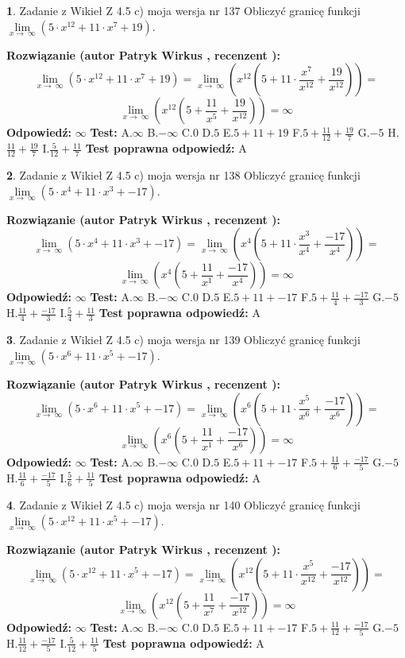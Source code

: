 \documentclass[12pt, a4paper]{article}
\theoremstyle{definition} %
\newtheorem{zad}{}
\newcommand{\zadStart}[1]{\begin{zad}#1\newline}
\newcommand{\zadStop}{\end{zad}}
\newcommand{\rozwStart}[2]{\noindent \textbf{Rozwiązanie (autor #1 , recenzent #2): }\newline}
\newcommand{\rozwStop}{\newline}
\newcommand{\odpStart}{\noindent \textbf{Odpowiedź:}\newline}
\newcommand{\odpStop}{\newline}
\newcommand{\testStart}{\noindent \textbf{Test:}\newline}
\newcommand{\testStop}{\newline}
\newcommand{\kluczStart}{\noindent \textbf{Test poprawna odpowiedź:}\newline}
\newcommand{\kluczStop}{\newline}
\begin{document}
\zadStart{Zadanie z Wikieł Z 4.5 c) moja wersja nr 137}
Obliczyć granicę funkcji  $\lim\limits_{x\to\ \infty}(5 \cdot x^{12}+11 \cdot x^{7}+19)$.
\zadStop
\rozwStart{Patryk Wirkus}{}
$$\lim\limits_{x\to\ \infty}(5 \cdot x^{12}+11 \cdot x^{7}+19) = \lim\limits_{x\to\ \infty}(x^{12}(5 +11 \cdot \frac{x^{7}}{x^{12}}+\frac{19}{x^{12}})) =$$ $$\lim\limits_{x\to\ \infty}(x^{12}(5 +\frac{11}{x^{5}}+\frac{19}{x^{12}})) =\infty$$
\rozwStop
\odpStart
$\infty$
\odpStop
\testStart
A.$\infty$ B.$-\infty$ C.$0$ D.$5$ E.$5 + 11 + 19$
F.$5+\frac{11}{12}+\frac{19}{7}$ G.$-5$
H.$\frac{11}{12}+\frac{19}{7}$
I.$\frac{5}{12}+\frac{11}{7}$
\testStop
\kluczStart
A
\kluczStop



\zadStart{Zadanie z Wikieł Z 4.5 c) moja wersja nr 138}
Obliczyć granicę funkcji  $\lim\limits_{x\to\ \infty}(5 \cdot x^{4}+11 \cdot x^{3}+-17)$.
\zadStop
\rozwStart{Patryk Wirkus}{}
$$\lim\limits_{x\to\ \infty}(5 \cdot x^{4}+11 \cdot x^{3}+-17) = \lim\limits_{x\to\ \infty}(x^{4}(5 +11 \cdot \frac{x^{3}}{x^{4}}+\frac{-17}{x^{4}})) =$$ $$\lim\limits_{x\to\ \infty}(x^{4}(5 +\frac{11}{x^{1}}+\frac{-17}{x^{4}})) =\infty$$
\rozwStop
\odpStart
$\infty$
\odpStop
\testStart
A.$\infty$ B.$-\infty$ C.$0$ D.$5$ E.$5 + 11 + -17$
F.$5+\frac{11}{4}+\frac{-17}{3}$ G.$-5$
H.$\frac{11}{4}+\frac{-17}{3}$
I.$\frac{5}{4}+\frac{11}{3}$
\testStop
\kluczStart
A
\kluczStop



\zadStart{Zadanie z Wikieł Z 4.5 c) moja wersja nr 139}
Obliczyć granicę funkcji  $\lim\limits_{x\to\ \infty}(5 \cdot x^{6}+11 \cdot x^{5}+-17)$.
\zadStop
\rozwStart{Patryk Wirkus}{}
$$\lim\limits_{x\to\ \infty}(5 \cdot x^{6}+11 \cdot x^{5}+-17) = \lim\limits_{x\to\ \infty}(x^{6}(5 +11 \cdot \frac{x^{5}}{x^{6}}+\frac{-17}{x^{6}})) =$$ $$\lim\limits_{x\to\ \infty}(x^{6}(5 +\frac{11}{x^{1}}+\frac{-17}{x^{6}})) =\infty$$
\rozwStop
\odpStart
$\infty$
\odpStop
\testStart
A.$\infty$ B.$-\infty$ C.$0$ D.$5$ E.$5 + 11 + -17$
F.$5+\frac{11}{6}+\frac{-17}{5}$ G.$-5$
H.$\frac{11}{6}+\frac{-17}{5}$
I.$\frac{5}{6}+\frac{11}{5}$
\testStop
\kluczStart
A
\kluczStop



\zadStart{Zadanie z Wikieł Z 4.5 c) moja wersja nr 140}
Obliczyć granicę funkcji  $\lim\limits_{x\to\ \infty}(5 \cdot x^{12}+11 \cdot x^{5}+-17)$.
\zadStop
\rozwStart{Patryk Wirkus}{}
$$\lim\limits_{x\to\ \infty}(5 \cdot x^{12}+11 \cdot x^{5}+-17) = \lim\limits_{x\to\ \infty}(x^{12}(5 +11 \cdot \frac{x^{5}}{x^{12}}+\frac{-17}{x^{12}})) =$$ $$\lim\limits_{x\to\ \infty}(x^{12}(5 +\frac{11}{x^{7}}+\frac{-17}{x^{12}})) =\infty$$
\rozwStop
\odpStart
$\infty$
\odpStop
\testStart
A.$\infty$ B.$-\infty$ C.$0$ D.$5$ E.$5 + 11 + -17$
F.$5+\frac{11}{12}+\frac{-17}{5}$ G.$-5$
H.$\frac{11}{12}+\frac{-17}{5}$
I.$\frac{5}{12}+\frac{11}{5}$
\testStop
\kluczStart
A
\kluczStop
\end{document}
